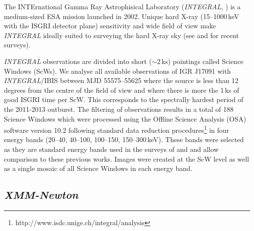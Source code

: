 \par The INTErnational Gamma Ray Astrophisical Laboratory (\textit{INTEGRAL}, \citealp{Winkler_IBIS}) is a medium-sized ESA mission launched in 2002. Unique hard X-ray (15--1000\,keV with the ISGRI detector plane) sensitivity and wide field of view make \textit{INTEGRAL} ideally suited to surveying the hard X-ray sky (see \citet{Bird_Survey} and \citet{Krivonos_Survey} for recent surveys). 
\par \textit{INTEGRAL} observations are divided into short ($\sim$2\,ks) pointings called Science Windows (ScWs). We analyse all available observations of IGR J17091 with \textit{INTEGRAL}/IBIS \citep{Ubertini_IBIS} between MJD 55575--55625 where the source is less than 12 degrees from the centre of the field of view and where there is more the 1\,ks of good ISGRI time per ScW. This corresponds to the spectrally hardest period of the 2011-2013 outburst. The filtering of observations results in a total of 188 Science Windows which were processed using the Offline Science Analysis (OSA) software version 10.2 following standard data reduction procedures\footnote{http://www.isdc.unige.ch/integral/analysis} in four energy bands (20--40, 40--100, 100--150, 150--300\,keV). These bands were selected as they are standard energy bands used in the surveys of \citet{Bird_Survey} and \citet{Bazzano_Survey} and allow comparison to these previous works. Images were created at the ScW level as well as a single mosaic of all Science Windows in each energy band.

\subsection{\textit{XMM-Newton}}
\label{sec:xmmdata}

